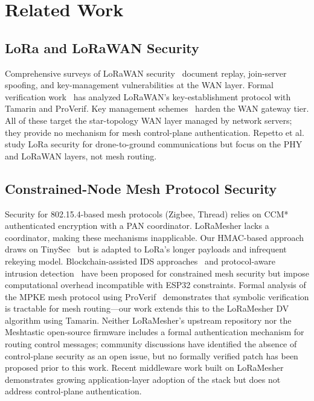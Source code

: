 \documentclass[preprint,12pt]{elsarticle}
\begin{document}
\section{Related Work}
\label{sec:related}

\subsection{LoRa and LoRaWAN Security}

Comprehensive surveys of LoRaWAN security~\cite{hessel2022-lorawan-survey}
document replay, join-server spoofing, and key-management vulnerabilities
at the WAN layer.
Formal verification work~\cite{ieee2025-lorawan-key-vulnerability,
ieee2025-lorawan-key-verification} has analyzed LoRaWAN's key-establishment
protocol with Tamarin and ProVerif. Key management schemes~\cite{lorawan-key-mgmt-2023,
mohamed2022-lorawan-gateways} harden the WAN gateway tier.
All of these target the star-topology WAN layer managed by network
servers; they provide no mechanism for mesh control-plane authentication.
Repetto et al.~\cite{repetto2025-lorawan-drone-attack} study LoRa
security for drone-to-ground communications but focus on the PHY
and LoRaWAN layers, not mesh routing.

\subsection{Constrained-Node Mesh Protocol Security}

Security for 802.15.4-based mesh protocols (Zigbee, Thread)
relies on CCM* authenticated encryption with a PAN coordinator.
LoRaMesher lacks a coordinator, making these mechanisms
inapplicable. Our HMAC-based approach draws on TinySec~\cite{karlof2004-tinysec}
but is adapted to LoRa's longer payloads and infrequent rekeying
model. Blockchain-assisted IDS approaches~\cite{springer2026-blockchain-ids}
and protocol-aware intrusion detection~\cite{bringye2026-lorawan-ids,ieee2025-lorawan-jamming-ids}
have been proposed for constrained mesh security but impose
computational overhead incompatible with ESP32 constraints.
Formal analysis of the MPKE mesh protocol using
ProVerif~\cite{ieee2025-mpke-proverif} demonstrates that
symbolic verification is tractable for mesh routing—our work
extends this to the LoRaMesher DV algorithm using Tamarin.
Neither LoRaMesher's upstream repository nor the Meshtastic
open-source firmware includes a formal authentication mechanism
for routing control messages; community discussions have
identified the absence of control-plane security as an open
issue, but no formally verified patch has been proposed prior
to this work.
Recent middleware work built on LoRaMesher~\cite{sole2025-loramesher-tecs}
demonstrates growing application-layer adoption of the stack but does
not address control-plane authentication.
\end{document}
